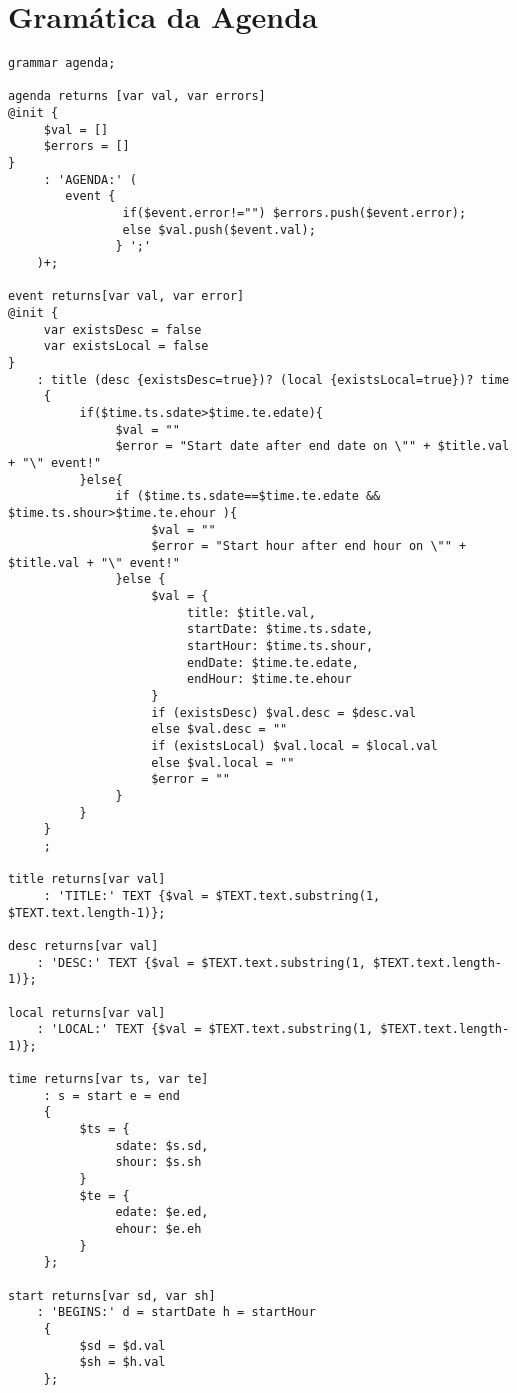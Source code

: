 \newpage
\section{Gramática da Agenda} \label{GAg}

\begin{lstlisting}[language=ANTLR]
grammar agenda;

agenda returns [var val, var errors]
@init {
     $val = []
     $errors = []
}   
     : 'AGENDA:' (
		event {
 				if($event.error!="") $errors.push($event.error);
				else $val.push($event.val);
               } ';'
	)+;

event returns[var val, var error]
@init {
     var existsDesc = false
     var existsLocal = false
}
	: title (desc {existsDesc=true})? (local {existsLocal=true})? time 
     {    
          if($time.ts.sdate>$time.te.edate){
               $val = ""
               $error = "Start date after end date on \"" + $title.val + "\" event!"
          }else{
               if ($time.ts.sdate==$time.te.edate && $time.ts.shour>$time.te.ehour ){
                    $val = ""
                    $error = "Start hour after end hour on \"" + $title.val + "\" event!"     
               }else {
                    $val = {
                         title: $title.val,
                         startDate: $time.ts.sdate,
                         startHour: $time.ts.shour,
                         endDate: $time.te.edate,
                         endHour: $time.te.ehour
                    }
                    if (existsDesc) $val.desc = $desc.val
                    else $val.desc = ""
                    if (existsLocal) $val.local = $local.val
                    else $val.local = ""
                    $error = ""
               }
          }
     }
     ;

title returns[var val]
     : 'TITLE:' TEXT {$val = $TEXT.text.substring(1, $TEXT.text.length-1)};

desc returns[var val]
	: 'DESC:' TEXT {$val = $TEXT.text.substring(1, $TEXT.text.length-1)};

local returns[var val]
	: 'LOCAL:' TEXT {$val = $TEXT.text.substring(1, $TEXT.text.length-1)};

time returns[var ts, var te]
     : s = start e = end 
     {
          $ts = {
               sdate: $s.sd,
               shour: $s.sh
          }
          $te = {
               edate: $e.ed,
               ehour: $e.eh
          }
     };

start returns[var sd, var sh]
	: 'BEGINS:' d = startDate h = startHour 
     {
          $sd = $d.val
          $sh = $h.val
     };


\end{lstlisting}
